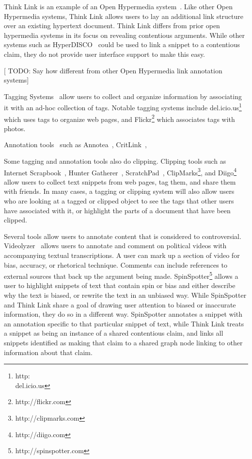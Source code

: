 \documentclass{chi2009}
\newcommand{\todo}[1]{{[\color{blue} TODO: #1]}}
\begin{document}
Think Link is an example of an Open Hypermedia system~\cite{Bouvin2000}. Like other Open Hypermedia systems, Think Link allows users to lay an additional link structure over an existing hypertext document. Think Link differs from prior open hypermedia systems in its focus on revealing contentious arguments. While other systems such as HyperDISCO~\cite{Wiil1996} could be used to link a snippet to a contentious claim, they do not provide user interface support to make this easy.

\todo{Say how different from other Open Hypermedia link annotation systems}

Tagging Systems~\cite{Marlow2006,Golder2006} allow users to collect and organize information by associating it with an ad-hoc collection of tags. Notable tagging systems include del.icio.us\footnote{http:\\del.icio.us} which uses tags to organize web pages, and Flickr\footnote{http://flickr.com} which associates tags with photos. 

Annotation tools~\cite{Marshall1998} such as Annotea~\cite{Koivunen2001}, CritLink~\cite{Yee2002}, 

Some tagging and annotation tools also do clipping. Clipping tools such as Internet Scrapbook~\cite{Sugiura19998}, Hunter Gatherer~\cite{2002}, ScratchPad~\cite{Gotz2007}, ClipMarks\footnote{http://clipmarks.com}, and Diigo\footnote{http://diigo.com} allow users to collect text snippets from web pages, tag them, and share them with friends. In many cases, a tagging or clipping system will also allow users who are looking at a tagged or clipped object to see the tags that other users have associated with it, or highlight the parts of a document that have been clipped.

Several tools allow users to annotate content that is considered to controversial. Videolyzer~\cite{Diakopoulos2008} allows users to annotate and comment on political videos with accompanying textual transcriptions. A user can mark up a section of video for bias, accuracy, or rhetorical technique. Comments can include references to external sources that back up the argument being made. SpinSpotter\footnote{http://spinspotter.com} allows a user to highlight snippets of text that contain spin or bias and either describe why the text is biased, or rewrite the text in an unbiased way. While SpinSpotter and Think Link share a goal of drawing user attention to biased or inaccurate information, they do so in a different way. SpinSpotter annotates a snippet with an annotation specific to that particular snippet of text, while Think Link treats a snippet as being an instance of a shared contentious claim, and links all snippets identified as making that claim to a shared graph node linking to other information about that claim.
\end{document}
